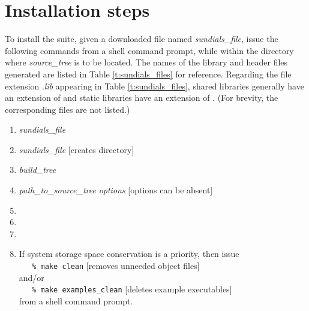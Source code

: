 \section{Installation steps}\label{ss:install_steps}

To install the {\sundials} suite, given a downloaded file named
{\em sundials\_file}, issue the following commands from
a shell command prompt, while within the directory where {\em source\_tree}
is to be located.  The names of the library and header files
generated are listed in Table \ref{t:sundials_files} for reference.  Regarding the file
extension .{\em lib} appearing in Table \ref{t:sundials_files}, shared libraries
generally have an extension of  and static libraries have an extension of
.  (For brevity, the corresponding  files are not listed.)
\begin{enumerate}
\item {} {\em sundials\_file}
\item {} {\em sundials\_file}\hspace{3em} [creates  directory]
\item {} {\em build\_tree}
\item {\em path\_to\_source\_tree} {\em options}\hspace{2em} [options can be absent]
\item {}
\item {}
\item {}
\item If system storage space conservation is a priority, then issue \\
\verb+   % make clean+ \hspace{2em} [removes unneeded object files] \\
and/or \\
\verb+   % make examples_clean+ \hspace{2em} [deletes example executables] \\
from a shell command prompt.
\end{enumerate}

